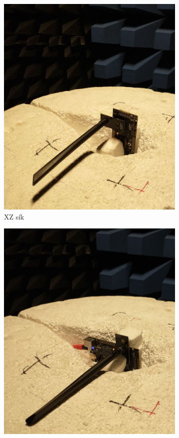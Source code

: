 \documentclass[a4paper,12pt,titlepage]{article}
\begin{document}
\begin{figure}
\begin{subfigure}{0.3\textwidth}
                    \includegraphics[width=\textwidth]{kep/szerkesztett/botantenna_XZ.jpg}
                    \caption{XZ sík}
                \end{subfigure}
                \begin{subfigure}{0.3\textwidth}
                    \includegraphics[width=\textwidth]{kep/szerkesztett/botantenna_YZ.jpg}

\end{subfigure}
\end{figure}
\end{document}
